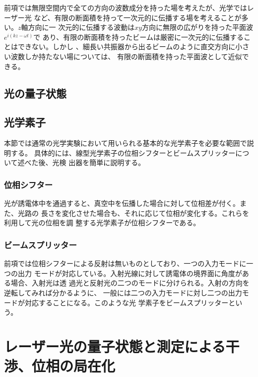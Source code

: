 \documentclass[11pt]{jsarticle}
\begin{document}
前項では無限空間内で全ての方向の波数成分を持った場を考えたが、光学ではレーザー光
など、有限の断面積を持って一次元的に伝播する場を考えることが多い。$z$軸方向に一
次元的に伝播する波動は$xy$方向に無限の広がりを持った平面波$e^{i(kz-\omega t)}$で
あり、有限の断面積を持ったビームは厳密に一次元的に伝播することはできない。しかし
、細長い共振器から出るビームのように直交方向に小さい波数しか持たない場については、
有限の断面積を持った平面波として近似できる。

\subsection{光の量子状態}
\label{sec:state}


\subsection{光学素子}
\label{sec:device}

本節では通常の光学実験において用いられる基本的な光学素子を必要な範囲で説明する。
具体的には、線型光学素子の位相シフターとビームスプリッターについて述べた後、光検
出器を簡単に説明する\cite{Leonhardt,Vogel}。

\subsubsection*{位相シフター}

光が誘電体中を通過すると、真空中を伝播した場合に対して位相差が付く。また、光路の
長さを変化させた場合も、それに応じて位相が変化する。これらを利用して光の位相を調
整する光学素子が位相シフターである。

\subsubsection*{ビームスプリッター}

前項では位相シフターによる反射は無いものとしており、一つの入力モードに一つの出力
モードが対応している。入射光線に対して誘電体の境界面に角度がある場合、入射光は透
過光と反射光の二つのモードに分けられる。入射の方向を逆転してみれば分かるように、
一般には二つの入力モードに対し二つの出力モードが対応することになる。このような光
学素子をビームスプリッターという。

\section{レーザー光の量子状態と測定による干渉、位相の局在化}
\label{chap:localization}
\end{document}
